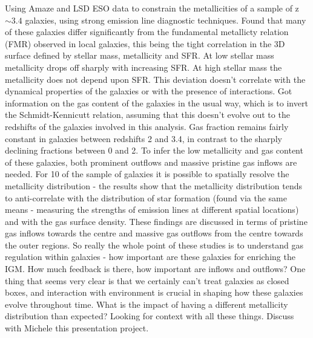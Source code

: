 \documentclass{literature}
\begin{document}
Using Amaze and LSD ESO data to constrain the metallicities of a sample of z $\sim 3.4$ galaxies, using strong emission line diagnostic techniques. Found that many of these galaxies differ significantly from the fundamental metallicty relation (FMR) observed in local galaxies, this being the tight correlation in the 3D surface defined by stellar mass, metallicity and SFR. At low stellar mass metallicity drops off sharply with increasing SFR. At high stellar mass the metallicity does not depend upon SFR. This deviation doesn't correlate with the dynamical properties of the galaxies or with the presence of interactions. Got information on the gas content of the galaxies in the usual way, which is to invert the Schmidt-Kennicutt relation, assuming that this doesn't evolve out to the redshifts of the galaxies involved in this analysis. Gas fraction remains fairly constant in galaxies between redshifts 2 and 3.4, in contrast to the sharply declining fractions between 0 and 2. To infer the low metallicity and gas content of these galaxies, both prominent outflows and massive pristine gas inflows are needed. For 10 of the sample of galaxies it is possible to spatially resolve the metallicity distribution - the results show that the metallicity distribution tends to anti-correlate with the distribution of star formation (found via the same means - measuring the strengths of emission lines at different spatial locations) and with the gas surface density. These findings are discussed in terms of pristine gas inflows towards the centre and massive gas outflows from the centre towards the outer regions. So really the whole point of these studies is to understand gas regulation within galaxies - how important are these galaxies for enriching the IGM. How much feedback is there, how important are inflows and outflows? One thing that seems very clear is that we certainly can't treat galaxies as closed boxes, and interaction with environment is crucial in shaping how these galaxies evolve throughout time. What is the impact of having a different metallicity distribution than expected? Looking for context with all these things. Discuss with Michele this presentation project.  \\ 
\end{document}
